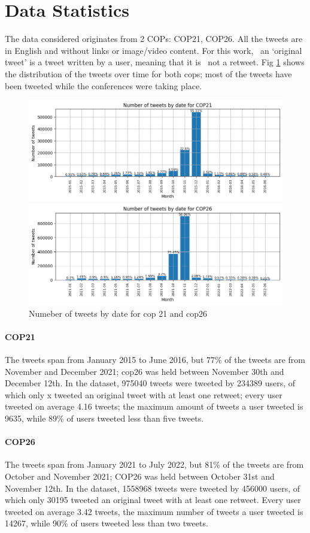 \section{ Data Statistics}
The data considered originates from 2 COPs: COP21, COP26. All the tweets are in English and without links or image/video content. For this work,  an ‘original tweet’ is a tweet written by a user, meaning that it is  not a retweet. Fig \ref{fig:tweets_by_date} shows the distribution of the tweets over time for both cops; most of the tweets have been tweeted while the conferences were taking place.

\begin{figure}[H]
    \centering
    \includegraphics[width=0.75\linewidth ]{Chapter3/figures/tweets_by_date_cop21.png}

    \includegraphics[width=0.75\linewidth ]{Chapter3/figures/tweets_by_date_cop26.png}
    \caption{Numeber of tweets by date for cop 21 and cop26}
    \label{fig:tweets_by_date}
\end{figure}

\paragraph{COP21}
The tweets span from January 2015 to June 2016, but 77\% of the tweets are from November and December 2021; cop26 was held between November 30th and December 12th. In the dataset, 975040 tweets were tweeted by 234389 users, of which only x tweeted an original tweet with at least one retweet; every user tweeted on average 4.16 tweets; the maximum amount of tweets a user tweeted is 9635, while 89\% of users tweeted less than five tweets.

\paragraph{COP26}
The tweets span from January 2021 to July 2022, but 81\%  of the tweets are from October and November 2021; COP26 was held between  October 31st and  November 12th. In the dataset, 1558968 tweets were tweeted by 456000 users, of which only 30195 tweeted an original tweet with at least one retweet. Every user tweeted on average 3.42 tweets, the maximum number of tweets a user tweeted is 14267, while 90\% of users tweeted less than two tweets.
\\


